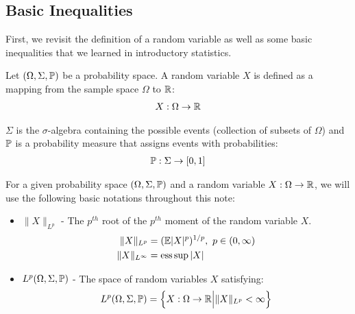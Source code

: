 \subsection{Basic Inequalities}
First, we revisit the definition of a random variable as well as some basic inequalities that we
learned in introductory statistics.

\begin{definition}
    Let $(\Omega, \Sigma, \mathbb{P})$ be a probability space. A random variable $X$ is defined as a mapping from the sample space $\Omega$ to $\mathbb{R}$:
    \begin{align}
        X:\Omega \to \mathbb{R}
    \end{align}

    \noindent $\Sigma$ is the $\sigma$-algebra containing the possible events (collection of subsets of $\Omega$) and $\mathbb{P}$ is a probability measure that assigns events with probabilities:
    \begin{align}
        \mathbb{P}: \Sigma \to [0,1]
    \end{align}
\end{definition}

\noindent For a given probability space $(\Omega, \Sigma, \mathbb{P})$ and a random variable $X:\Omega\to\mathbb{R}$, we will use the following basic notations throughout this note:
\begin{itemize}
    \item $\|X\|_{L^p}$ - The $p^{th}$ root of the $p^{th}$ moment of the random variable $X$.
    \begin{align}
        \|X\|_{L^p} &= (\mathbb{E}|X|^p)^{1/p}, \ p \in (0,\infty) \\
        \|X\|_{L^\infty} &= \operatorname*{ess\,sup} |X|
    \end{align}

    \item $L^p(\Omega, \Sigma, \mathbb{P})$ -  The space of random variables $X$ satisfying:
    \begin{align}
        L^p(\Omega, \Sigma, \mathbb{P}) = \Big\{ 
            X : \Omega\to\mathbb{R} \Big| \|X\|_{L^p} < \infty
         \Big\}
    \end{align}
\end{itemize}


